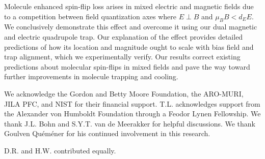 \documentclass[%
 reprint,
groupedaddress,
 amsmath,amssymb,
 aps,
prl,
]{revtex4-1}
\newcommand{\epb}{{$E\!\perp\!B$}}
\begin{document}
Molecule enhanced spin-flip loss arises in mixed electric and magnetic fields due to a competition between field quantization axes where \epb{} and $\mu_BB<d_EE$. We conclusively demonstrate this effect and overcome it using our dual magnetic and electric quadrupole trap. Our explanation of the effect provides detailed predictions of how its location and magnitude ought to scale with bias field and trap alignment, which we experimentally verify. Our results correct existing predictions about molecular spin-flips in mixed fields and pave the way toward further improvements in molecule trapping and cooling.

We acknowledge the Gordon and Betty Moore Foundation, the ARO-MURI, JILA PFC, and NIST for their financial support. T.L. acknowledges support from the Alexander von Humboldt Foundation through a Feodor Lynen Fellowship. We thank J.L. Bohn and S.Y.T. van de Meerakker for helpful discussions. We thank Goulven Qu\'em\'ener for his continued involvement in this research.

D.R. and H.W. contributed equally.


\end{document}
